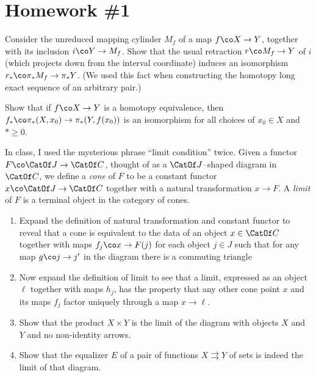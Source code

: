 
\section{Homework \#1}

\begin{problem}
Consider the unreduced mapping cylinder $M_f$ of a map $f\co X \to Y$, together with its inclusion $i\co Y \to M_f$.  Show that the usual retraction $r\co M_f \to Y$ of $i$ (which projects down from the interval coordinate) induces an isomorphism $r_*\co \pi_* M_f \to \pi_* Y$.  (We used this fact when constructing the homotopy long exact sequence of an arbitrary pair.)
\end{problem}

\begin{problem}
Show that if $f\co X \to Y$ is a homotopy equivalence, then $f_*\co \pi_*(X, x_0) \to \pi_*(Y, f(x_0))$ is an isomorphism for all choices of $x_0 \in X$ and $* \ge 0$.
\end{problem}

\begin{problem}
In class, I used the mysterious phrase ``limit condition'' twice.  Given a functor $F\co \CatOf J \to \CatOf C$, thought of as a $\CatOf J$--shaped diagram in $\CatOf C$, we define a \textit{cone} of $F$ to be a constant functor $x\co \CatOf J \to \CatOf C$ together with a natural transformation $x \to F$.  A \textit{limit} of $F$ is a terminal object in the category of cones.
\begin{enumerate}
    \item Expand the definition of natural transformation and constant functor to reveal that a cone is equivalent to the data of an object $x \in \CatOf C$ together with maps $f_j\co x \to F(j)$ for each object $j \in J$ such that for any map $g\co j \to j'$ in the diagram there is a commuting triangle
    \begin{center}
    \end{center}
    \item Now expand the definition of limit to see that a limit, expressed as an object $\ell$ together with maps $h_j$, has the property that any other cone point $x$ and its maps $f_j$ factor uniquely through a map $x \to \ell$.
    \item Show that the product $X \times Y$ is the limit of the diagram with objects $X$ and $Y$ and no non-identity arrows.
    \item Show that the equalizer $E$ of a pair of functions $X \rightrightarrows Y$ of sets is indeed the limit of that diagram.
\end{enumerate}
\end{problem}

